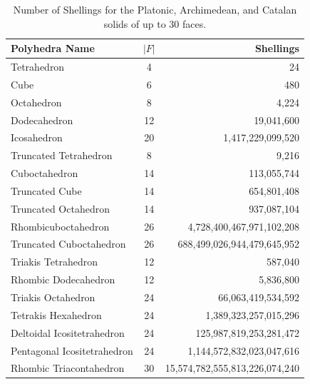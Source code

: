 \begin{table}[ht]
\centering
\begin{tabular}{ l | c | r}
Polyhedra Name & $|F|$ & Shellings \\
  \hline    
Tetrahedron                     & 4  	& 24 \\                         
Cube                            & 6  	& 480 \\                        
Octahedron                      & 8  	& 4,224\\                       
Dodecahedron                    & 12 	& 19,041,600 \\                 
Icosahedron                     & 20 	& 1,417,229,099,520 \\ \hline   
Truncated Tetrahedron           & 8     & 9,216 \\                      
Cuboctahedron                   & 14	& 113,055,744 \\                
Truncated Cube                  & 14	& 654,801,408 \\                
Truncated Octahedron            & 14	& 937,087,104 \\                
Rhombicuboctahedron             & 26	& 4,728,400,467,971,102,208 \\  
Truncated Cuboctahedron         & 26	& 688,499,026,944,479,645,952 \\ \hline
Triakis Tetrahedron             & 12    & 587,040\\                     
Rhombic Dodecahedron            & 12 	& 5,836,800\\                   
Triakis Octahedron              & 24	& 66,063,419,534,592 \\         
Tetrakis Hexahedron             & 24	& 1,389,323,257,015,296 \\      
Deltoidal Icositetrahedron      & 24	& 125,987,819,253,281,472\\     
Pentagonal Icositetrahedron     & 24	& 1,144,572,832,023,047,616 \\  
Rhombic Triacontahedron         & 30	& 15,574,782,555,813,226,074,240 \\
\end{tabular}
\caption{Number of Shellings for the Platonic, Archimedean, and Catalan solids of up to 30 faces.}
\label{tab:Shellings}
\end{table}


